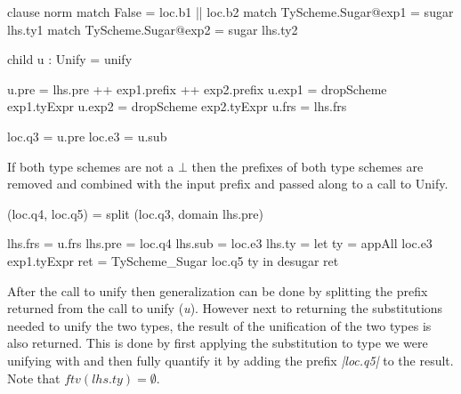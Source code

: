 \begin{code}
clause norm
    match False = loc.b1 || loc.b2
    match TyScheme.Sugar@exp1 = sugar lhs.ty1
    match TyScheme.Sugar@exp2 = sugar lhs.ty2
        
    child u : Unify = unify
        
    u.pre   = lhs.pre ++ exp1.prefix ++ exp2.prefix
    u.exp1  = dropScheme exp1.tyExpr
    u.exp2  = dropScheme exp2.tyExpr
    u.frs   = lhs.frs
            
    loc.q3  = u.pre
    loc.e3  = u.sub
\end{code}
If both type schemes are not a $\bot$ then the prefixes of both type schemes are removed and combined with the input prefix and passed along to a call to Unify.

\begin{code}    
(loc.q4, loc.q5) = split (loc.q3, domain lhs.pre)
    
lhs.frs  = u.frs
lhs.pre  = loc.q4
lhs.sub  = loc.e3
lhs.ty   =  let  ty   = appAll loc.e3 exp1.tyExpr
                 ret  = TyScheme_Sugar loc.q5 ty
            in desugar ret
\end{code}
After the call to unify then generalization can be done by splitting the prefix returned from the call to unify (\emph{u}). However next to returning the substitutions needed to unify the two types, the result of the unification of the two types is also returned. This is done by first applying the substitution to type we were unifying with and then fully quantify it by adding the prefix \emph{|loc.q5|} to the result. Note that $ftv(lhs.ty)=\emptyset$.
